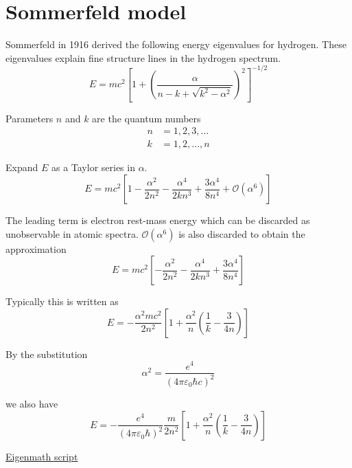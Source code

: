 

\section*{Sommerfeld model}

Sommerfeld in 1916 derived the following energy eigenvalues for hydrogen.
These eigenvalues explain fine structure lines in the hydrogen spectrum.
\begin{equation*}
E=mc^2\left[1+\left(
\frac{\alpha}{n-k+\sqrt{k^2-\alpha^2}}\right)^2\right]^{-1/2}
\end{equation*}

Parameters $n$ and $k$ are the quantum numbers
\begin{align*}
n&=1,2,3,\ldots
\\
k&=1,2,\ldots,n
\end{align*}

Expand $E$ as a Taylor series in $\alpha$.
\begin{equation*}
E=mc^2\left[1-\frac{\alpha^2}{2n^2}-\frac{\alpha^4}{2kn^3}+\frac{3\alpha^4}{8n^4}
+\mathcal O(\alpha^6)\right]
\tag{1}
\end{equation*}

The leading term is electron rest-mass energy which can be discarded as unobservable in atomic spectra.
$\mathcal O(\alpha^6)$ is also discarded to obtain the approximation
\begin{equation*}
E=mc^2\left[-\frac{\alpha^2}{2n^2}-\frac{\alpha^4}{2kn^3}+\frac{3\alpha^4}{8n^4}\right]
\end{equation*}

Typically this is written as
\begin{equation*}
E=-\frac{\alpha^2mc^2}{2n^2}
\left[1+\frac{\alpha^2}{n}\left(\frac{1}{k}-\frac{3}{4n}\right)\right]
\tag{2}
\end{equation*}

By the substitution
\begin{equation*}
\alpha^2=\frac{e^4}{(4\pi\varepsilon_0\hbar c)^2}
\end{equation*}

we also have
\begin{equation*}
E=-\frac{e^4}{(4\pi\varepsilon_0\hbar)^2}
\frac{m}{2n^2}
\left[1+\frac{\alpha^2}{n}\left(\frac{1}{k}-\frac{3}{4n}\right)\right]
\end{equation*}

\href{https://georgeweigt.github.io/examples/sommerfeld-model-demo.html}{Eigenmath script}


